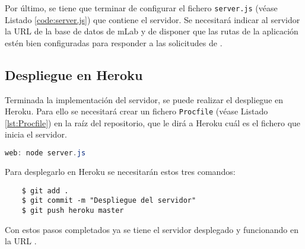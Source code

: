 Por último, se tiene que terminar de configurar el fichero \texttt{server.js} (véase Listado \ref{code:server.js})  que contiene el servidor. Se necesitará indicar al servidor la URL de la base de datos de mLab y de disponer que las rutas de la aplicación estén bien configuradas para responder a las solicitudes de \ULLAR{}. 


\subsection{Despliegue en Heroku}

Terminada la implementación del servidor, se puede realizar el despliegue en Heroku. Para ello se necesitará crear un fichero \texttt{Procfile} (véase Listado \ref{lst:Procfile}) en la raíz del repositorio, que le dirá a Heroku cuál es el fichero que inicia el servidor.

\begin{lstlisting}[language=java, caption={Fichero \texttt{Procfile}.}, label={lst:Procfile},]
    web: node server.js
\end{lstlisting}

Para desplegarlo en Heroku se necesitarán estos tres comandos:

\begin{lstlisting}
    $ git add .
    $ git commit -m "Despliegue del servidor"
    $ git push heroku master
\end{lstlisting}

Con estos pasos completados ya se tiene el servidor desplegado y funcionando en la URL \cite{URL::servidorULLAR}.




